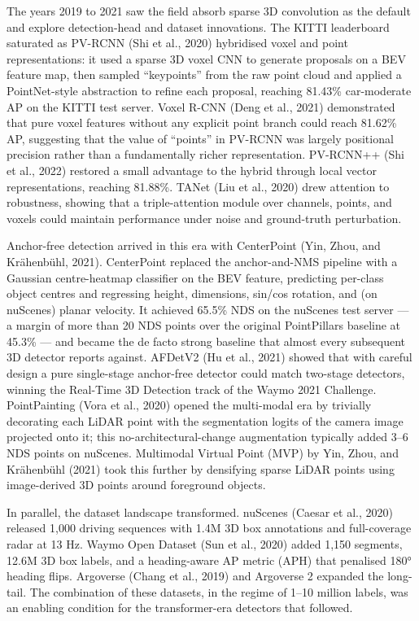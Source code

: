 The years 2019 to 2021 saw the field absorb sparse 3D convolution as the default and explore detection-head and dataset innovations. The KITTI leaderboard saturated as PV-RCNN (Shi et al., 2020) hybridised voxel and point representations: it used a sparse 3D voxel CNN to generate proposals on a BEV feature map, then sampled ``keypoints'' from the raw point cloud and applied a PointNet-style abstraction to refine each proposal, reaching 81.43\% car-moderate AP on the KITTI test server. Voxel R-CNN (Deng et al., 2021) demonstrated that pure voxel features without any explicit point branch could reach 81.62\% AP, suggesting that the value of ``points'' in PV-RCNN was largely positional precision rather than a fundamentally richer representation. PV-RCNN++ (Shi et al., 2022) restored a small advantage to the hybrid through local vector representations, reaching 81.88\%. TANet (Liu et al., 2020) drew attention to robustness, showing that a triple-attention module over channels, points, and voxels could maintain performance under noise and ground-truth perturbation.

Anchor-free detection arrived in this era with CenterPoint (Yin, Zhou, and Krähenbühl, 2021). CenterPoint replaced the anchor-and-NMS pipeline with a Gaussian centre-heatmap classifier on the BEV feature, predicting per-class object centres and regressing height, dimensions, sin/cos rotation, and (on nuScenes) planar velocity. It achieved 65.5\% NDS on the nuScenes test server --- a margin of more than 20 NDS points over the original PointPillars baseline at 45.3\% --- and became the de facto strong baseline that almost every subsequent 3D detector reports against. AFDetV2 (Hu et al., 2021) showed that with careful design a pure single-stage anchor-free detector could match two-stage detectors, winning the Real-Time 3D Detection track of the Waymo 2021 Challenge. PointPainting (Vora et al., 2020) opened the multi-modal era by trivially decorating each LiDAR point with the segmentation logits of the camera image projected onto it; this no-architectural-change augmentation typically added 3--6 NDS points on nuScenes. Multimodal Virtual Point (MVP) by Yin, Zhou, and Krähenbühl (2021) took this further by densifying sparse LiDAR points using image-derived 3D points around foreground objects.

In parallel, the dataset landscape transformed. nuScenes (Caesar et al., 2020) released 1,000 driving sequences with 1.4M 3D box annotations and full-coverage radar at 13 Hz. Waymo Open Dataset (Sun et al., 2020) added 1,150 segments, 12.6M 3D box labels, and a heading-aware AP metric (APH) that penalised 180° heading flips. Argoverse (Chang et al., 2019) and Argoverse 2 expanded the long-tail. The combination of these datasets, in the regime of 1--10 million labels, was an enabling condition for the transformer-era detectors that followed.

